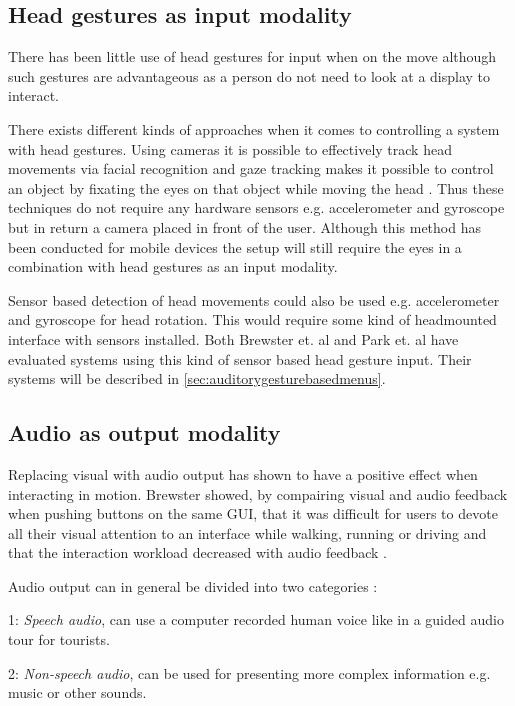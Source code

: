 \subsection{Head gestures as input modality}

There has been little use of head gestures for input when on the move \cite{brewster_multimodal_2003} although such gestures are advantageous as a person do not need to look at a display to interact.

There exists different kinds of approaches when it comes to controlling a system with head gestures. Using cameras it is possible to effectively track head movements via facial recognition \cite{morimoto_recognition_1996} and gaze tracking makes it possible to control an object by fixating the eyes on that object while moving the head \cite{vspakov_enhanced_2012}. Thus these techniques do not require any hardware sensors e.g. accelerometer and gyroscope but in return a camera placed in front of the user. Although this method has been conducted for mobile devices \cite{mardanbegi_eye-based_2012} the setup will still require the eyes in a combination with head gestures as an input modality.

Sensor based detection of head movements could also be used e.g. accelerometer and gyroscope for head rotation. This would require some kind of headmounted interface with sensors installed. Both Brewster et. al \cite{brewster_multimodal_2003} and Park et. al \cite{park_gaze-directed_2011} have evaluated systems using this kind of sensor based head gesture input. Their systems will be described in \ref{sec:auditorygesturebasedmenus}.

\subsection{Audio as output modality}
\label{sec:audiomodality}
Replacing visual with audio output has shown to have a positive effect when interacting in motion. Brewster showed, by compairing visual and audio feedback when pushing buttons on the same GUI, that it was difficult for users to devote all their visual attention to an interface while walking, running or driving and that the interaction workload decreased with audio feedback \cite{brewster_overcoming_2002}.

Audio output can in general be divided into two categories \cite{rocchesso_sounding_2003}:
\begin{description}
\item{1: \textit{Speech audio}}, can use a computer recorded human voice like in a guided audio tour for tourists.
\item{2: \textit{Non-speech audio}}, can be used for presenting more complex information e.g. music or other sounds.
\end{description}

